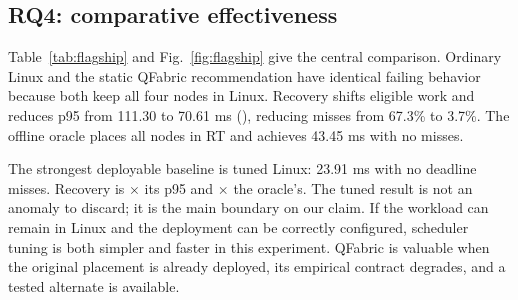 \documentclass[conference]{IEEEtran}
\newcommand{\system}{QFabric\xspace}
\begin{document}
\subsection{RQ4: comparative effectiveness}
Table~\ref{tab:flagship} and Fig.~\ref{fig:flagship} give the central comparison.
Ordinary Linux and the static \system recommendation have identical failing
behavior because both keep all four nodes in Linux. Recovery shifts eligible
work and reduces p95 from 111.30 to 70.61 ms (\RecoveryImprovement), reducing
misses from 67.3\% to 3.7\%. The offline oracle places all nodes in RT and
achieves 43.45 ms with no misses.

The strongest deployable baseline is tuned Linux: 23.91 ms with no deadline
misses. Recovery is \RecoveryTunedRatio$\times$ its p95 and
\RecoveryOracleRatio$\times$ the oracle's. The tuned result is not an anomaly to
discard; it is the main boundary on our claim. If the workload can remain in
Linux and the deployment can be correctly configured, scheduler tuning is both
simpler and faster in this experiment. \system is valuable when the original
placement is already deployed, its empirical contract degrades, and a tested
alternate is available.

\begin{table}[t]
\caption{Flagship four-node load-shift result. L denotes Linux and R denotes RT;
recovery and oracle placements vary over the trace.}
\label{tab:flagship}
\centering

\end{table}
\end{document}
